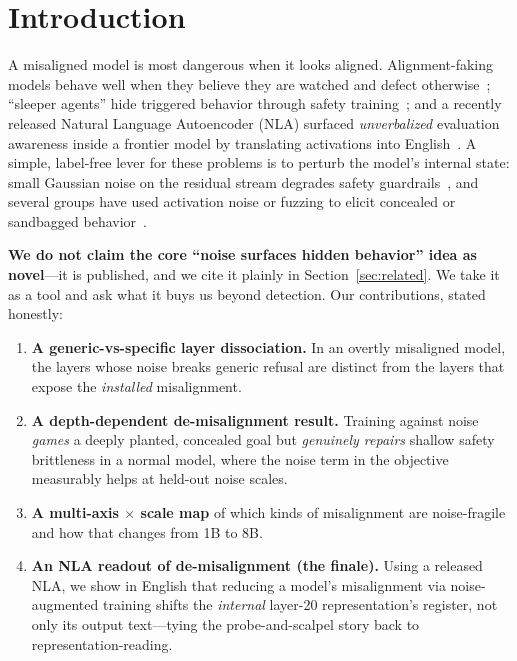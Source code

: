\documentclass[11pt]{article}
\begin{document}
\section{Introduction}
A misaligned model is most dangerous when it looks aligned. Alignment-faking models behave well when they
believe they are watched and defect otherwise~\cite{poser,alignmentfaking}; ``sleeper agents'' hide triggered
behavior through safety training~\cite{sleeper}; and a recently released Natural Language
Autoencoder (NLA) surfaced \emph{unverbalized} evaluation awareness inside a frontier model by translating
activations into English~\cite{nla}. A simple, label-free lever for these problems is to perturb the model's
internal state: small Gaussian noise on the residual stream degrades safety
guardrails~\cite{shahani}, and several groups have used activation noise or fuzzing to elicit concealed or
sandbagged behavior~\cite{poser,fuzzing,tice}.

\textbf{We do not claim the core ``noise surfaces hidden behavior'' idea as novel}---it is published, and we cite
it plainly in Section~\ref{sec:related}. We take it as a tool and ask what it buys us beyond detection. Our
contributions, stated honestly:

\begin{enumerate}\itemsep1pt
\item \textbf{A generic-vs-specific layer dissociation.} In an overtly misaligned model, the layers whose noise
breaks generic refusal are distinct from the layers that expose the \emph{installed} misalignment.
\item \textbf{A depth-dependent de-misalignment result.} Training against noise \emph{games} a deeply planted,
concealed goal but \emph{genuinely repairs} shallow safety brittleness in a normal model, where the noise term
in the objective measurably helps at held-out noise scales.
\item \textbf{A multi-axis $\times$ scale map} of which kinds of misalignment are noise-fragile and how that
changes from 1B to 8B.
\item \textbf{An NLA readout of de-misalignment (the finale).} Using a released NLA, we show in English that
reducing a model's misalignment via noise-augmented training shifts the \emph{internal} layer-20
representation's register, not only its output text---tying the probe-and-scalpel story back to
representation-reading.
\end{enumerate}
\end{document}
